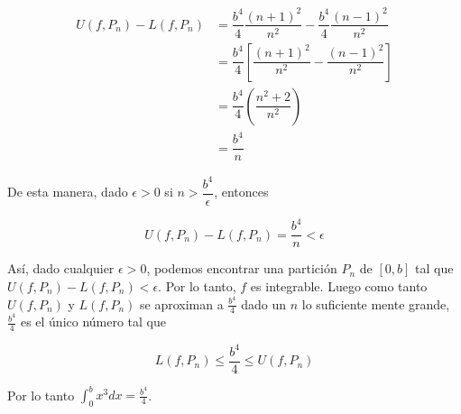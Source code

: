 \documentclass{report}
\begin{document}
\begin{enumerate}
        \begin{align*}
            U(f, P_n) - L(f, P_n) &= \dfrac{b^4}{4} \dfrac{(n+1)^2}{n^2} - \dfrac{b^4}{4} \dfrac{(n-1)^2}{n^2}\\
            &= \dfrac{b^4}{4} \left[\dfrac{(n+1)^2}{n^2} - \dfrac{(n-1)^2}{n^2}\right]\\
            &= \dfrac{b^4}{4} \left(\dfrac{n^2+2}{n^2}\right)\\
            &= \dfrac{b^4}{n}
        \end{align*}

        De esta manera, dado $\epsilon > 0$ si $n > \dfrac{b^4}{\epsilon}$, entonces

        $$U(f, P_n) - L(f, P_n) = \dfrac{b^4}{n} < \epsilon$$

        Así, dado cualquier $\epsilon > 0$, podemos encontrar una partición $P_n$ de $[0,b]$ tal que $U(f, P_n) - L(f, P_n) < \epsilon$. Por lo tanto, $f$ es integrable. Luego como tanto $U(f, P_n)$ y $L(f, P_n)$ se aproximan a $\frac{b^4}{4}$ dado un $n$ lo suficiente mente grande, $\frac{b^4}{4}$ es el único número tal que

        $$L(f, P_n) \leq \frac{b^4}{4} \leq U(f, P_n)$$

        Por lo tanto $\int_{0}^{b} x^3 dx = \frac{b^4}{4}$.
    \end{enumerate}
\end{document}
